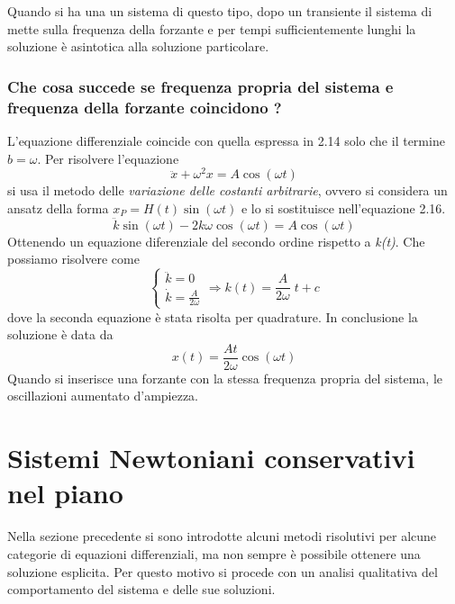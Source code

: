 \noindent Quando si ha una un sistema di questo tipo, dopo un transiente il sistema di mette sulla frequenza della forzante e per tempi sufficientemente lunghi la soluzione \`{e} asintotica alla soluzione particolare.

\subsubsection{Che cosa succede se frequenza propria del sistema e frequenza della forzante coincidono ?}
L'equazione differenziale coincide con quella espressa in  2.14 solo che il termine $b = \omega $. Per risolvere l'equazione 
\begin{equation}
	\ddot{x} + \omega^2 x= A\cos(\omega t) 
\end{equation}
si usa il metodo delle \textit{variazione delle costanti arbitrarie}, ovvero si considera un ansatz della forma $x_P = H(t) \sin(\omega t)$ e lo si sostituisce nell'equazione 2.16.
\begin{equation}
	\ddot{k} \sin(\omega t) - 2k\omega \cos(\omega t) = A \cos(\omega t)
\end{equation}
Ottenendo un equazione diferenziale del secondo ordine rispetto a \textit{k(t)}. Che possiamo risolvere come 
\begin{equation*}
	\left \{ \begin{array}{l}
		\ddot{k} = 0 \\ 
		\dot{k} = \frac{A}{2\omega} 
	\end{array} \right. 
	\Rightarrow k(t) = \frac{A}{2\omega} \;t + c
\end{equation*}
dove la seconda equazione \`{e} stata risolta per quadrature. In conclusione la soluzione \`{e} data da 
\begin{equation}
	x(t) = \frac{A t}{2 \omega} \cos(\omega t)
\end{equation}
Quando si inserisce una forzante con la stessa frequenza propria del sistema, le oscillazioni aumentato d'ampiezza.

\section{Sistemi Newtoniani conservativi nel piano}

Nella sezione precedente si sono introdotte alcuni metodi risolutivi per alcune categorie di equazioni differenziali, ma non sempre \`{e} possibile ottenere una soluzione esplicita. Per questo motivo si procede con un analisi qualitativa del comportamento del sistema e delle sue soluzioni.
\newpage 
